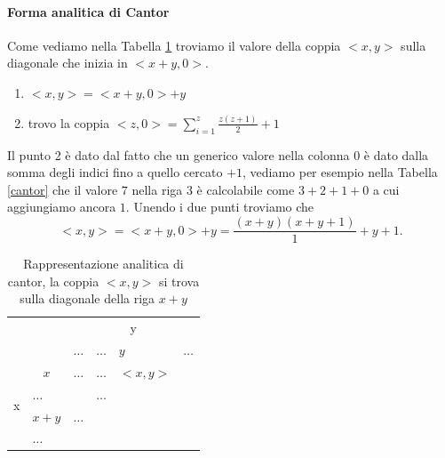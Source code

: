 \documentclass{article}
\begin{document}
\paragraph{Forma analitica di Cantor}
Come vediamo nella Tabella \ref{cantoranal} troviamo il valore della coppia $ <x,y> $ sulla diagonale che inizia in $ <x+y,0 >$.
\begin{enumerate}
	\item $ <x,y>=<x+y,0>+y $
	\item trovo la coppia $<z,0> =  \sum\limits_{i=1}^z \frac{z(z+1)}{2} + 1$
\end{enumerate}
Il punto 2 è dato dal fatto che un generico valore nella colonna $0$ è dato dalla somma degli indici fino a quello cercato $+1$, vediamo per esempio nella Tabella \ref{cantor} che il valore $7$ nella riga $3$ è calcolabile come $3+2+1+0$ a cui aggiungiamo ancora $1$.
Unendo i due punti troviamo che 
\begin{displaymath}
 <x,y>=<x+y,0> + y = \frac{(x+y)(x+y+1)}{1} + y + 1.
\end{displaymath}

\begin{table}[]
\label{cantoranal}
\caption{Rappresentazione analitica di cantor, la coppia $<x,y>$ si trova sulla diagonale della riga $x+y$}
\begin{center}

\begin{tabular}{ll|llll}
\cline{3-6}
                                         &                        & \multicolumn{4}{c|}{y}                                                                                                \\ \cline{3-6} 
                                         &                        & \multicolumn{1}{c|}{$\dots$} & \multicolumn{1}{l|}{$\dots$} & \multicolumn{1}{l|}{$y$} & \multicolumn{1}{l|}{$\dots$} \\ \hline
\multicolumn{1}{|l|}{\multirow{4}{*}{x}} & \multicolumn{1}{c|}{$x$} & $\dots$                      & $\dots$                      & $<x,y>$                  &                              \\ \cline{2-2}
\multicolumn{1}{|l|}{}                   & $\dots$                &                              & $\dots$                      &                          &                              \\ \cline{2-2}
\multicolumn{1}{|l|}{}                   & $x+y$                  & $\dots$                      &                              &                          &                              \\ \cline{2-2}
\multicolumn{1}{|l|}{}                   & $\dots$                &                              &                              &                          &                              \\ \cline{1-2}
\end{tabular}
\end{center}
\end{table}
\end{document}
